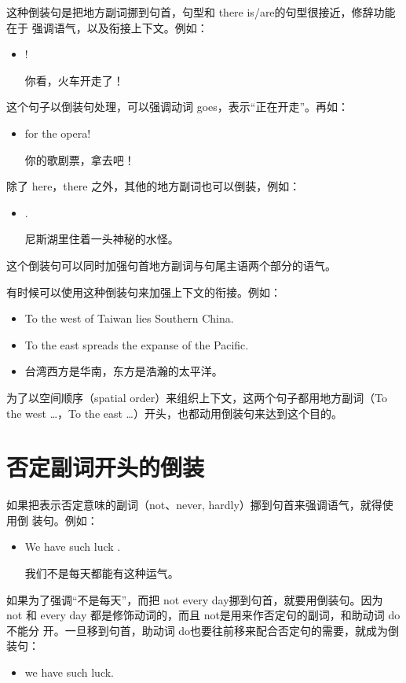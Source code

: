 这种倒装句是把地方副词挪到句首，句型和 there is/are的句型很接近，修辞功能在于
强调语气，以及衔接上下文。例如：
\begin{itemize}
\item {}  !

  你看，火车开走了！
\end{itemize}
这个句子以倒装句处理，可以强调动词 goes，表示“正在开走”。再如：
\begin{itemize}
\item {}   for the opera!

  你的歌剧票，拿去吧！
\end{itemize}
除了 here，there 之外，其他的地方副词也可以倒装，例如：
\begin{itemize}
\item {}  .

  尼斯湖里住着一头神秘的水怪。
\end{itemize}
这个倒装句可以同时加强句首地方副词与句尾主语两个部分的语气。

有时候可以使用这种倒装句来加强上下文的衔接。例如：
\begin{itemize}
\item To the west of Taiwan lies Southern China.

\item To the east spreads the expanse of the Pacific.

\item 台湾西方是华南，东方是浩瀚的太平洋。
\end{itemize}
为了以空间顺序（spatial order）来组织上下文，这两个句子都用地方副词（To the
west \ldots，To the east \ldots）开头，也都动用倒装句来达到这个目的。

\section{否定副词开头的倒装}

如果把表示否定意味的副词（not、never, hardly）挪到句首来强调语气，就得使用倒
装句。例如：
\begin{itemize}
\item We  have such luck .

  我们不是每天都能有这种运气。
\end{itemize}
如果为了强调“不是每天”，而把 not every day挪到句首，就要用倒装句。因为 not
和 every day 都是修饰动词的，而且 not是用来作否定句的副词，和助动词 do 不能分
开。一旦移到句首，助动词 do也要往前移来配合否定句的需要，就成为倒装句：
\begin{itemize}
\item {} we have such luck.
\end{itemize}

